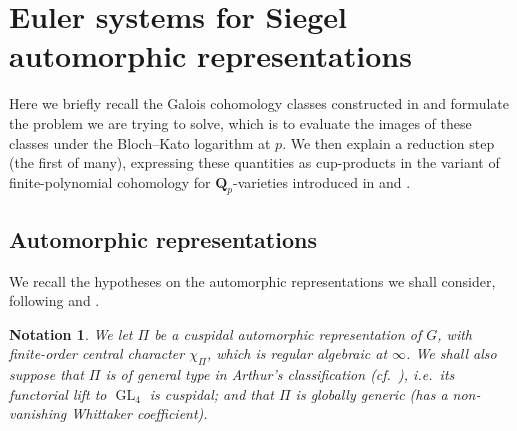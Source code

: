 \documentclass[cjm]{ipart}
\theoremstyle{plain}
\newtheorem{notation}[theorem]{Notation}
\theoremstyle{remark}
\DeclareMathOperator{\GL}{GL}
\newcommand{\QQ}{\mathbf{Q}}
\newcommand{\Qp}{\QQ_p}
\numberwithin{equation}{subsection}
\begin{document}






\section{Euler systems for Siegel automorphic representations}\label{sect:ES}

 Here we briefly recall the Galois cohomology classes constructed in \cite{LSZ17, LZ-equivar} and formulate the problem we are trying to solve, which is to evaluate the images of these classes under the Bloch--Kato logarithm at $p$. We then explain a reduction step (the first of many), expressing these quantities as cup-products in the variant of finite-polynomial cohomology for $\Qp$-varieties introduced in \cite{nekovarniziol16} and \cite{besserloefflerzerbes16}.

 \subsection{Automorphic representations}

  We recall the hypotheses on the automorphic representations we shall consider, following \cite[\S 10.1]{LSZ17} and \cite[\S 3.1]{LZ-equivar}.

  \begin{notation}
   We let $\Pi$ be a cuspidal automorphic representation of $G$, with finite-order central character $\chi_{\Pi}$, which is regular algebraic at $\infty$. We shall also suppose that $\Pi$ is \emph{of general type} in Arthur's classification (cf.~\cite{arthur04}), i.e.~its functorial lift to $\GL_4$ is cuspidal; and that $\Pi$ is \emph{globally generic} (has a non-vanishing Whittaker coefficient).
  \end{notation}
\end{document}
